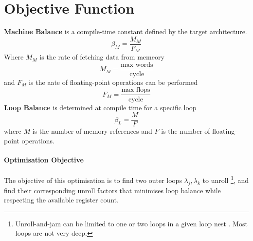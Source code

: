 \section{Objective Function}

\textbf{Machine Balance} is a compile-time constant defined by the target
architecture.
\begin{equation}
  \label{eq:ck94-machine-balance}
\beta_{M} = \frac{M_{M}}{F_{M}}
\end{equation}
Where $M_{M}$ is the rate of fetching data from memeory
\[
M_{M} = \frac{\text{max words}}{\text{cycle}}
\]
and $F_{M}$ is the aate of floating-point operations can be performed
\[
F_{M} = \frac{\text{max flops}}{\text{cycle}}
\]
\textbf{Loop Balance} is determined at compile time for a specific loop
\begin{equation}
  \label{eq:ck94-loop-balance}
\beta_{L} = \frac{M}{F}
\end{equation}
where $M$ is the number of memory references and $F$ is the number of
floating-point operations.

\paragraph{Optimisation Objective}
The objective of this optimisation is to find two outer loops $\lambda_{j},
\lambda_{k}$ to unroll
\footnote{Unroll-and-jam can be limited to one or two loops in a given loop nest
\cite{carrKennedy1994}. Most loops are not very deep.}, and find their
corresponding unroll factors that
minimises loop balance while respecting the available register count.

